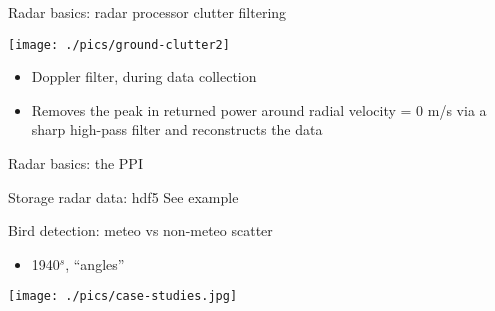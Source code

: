 \documentclass[usenames,dvipsnames]{beamer}
\begin{document}
\begin{frame}{Radar basics: radar processor clutter filtering}
	\begin{center}
		\texttt{[image: ./pics/ground-clutter2]}
	\end{center}

	\begin{itemize}				
		\item Doppler filter, during data collection
		\item Removes the peak in returned power around radial velocity = 0 m/s via a sharp high-pass filter and reconstructs the data
	\end{itemize}
\end{frame}



\begin{frame}{Radar basics: the PPI}
\centering
{}
\end{frame}


\begin{frame}{Storage radar data: hdf5}
See example
\end{frame}


\begin{frame}{Bird detection: meteo vs non-meteo scatter}
\begin{itemize}
	\item 1940$^s$, ``angles''
\end{itemize}
\begin{center}
		\texttt{[image: ./pics/case-studies.jpg]}
\end{center}
\end{frame}
\end{document}
